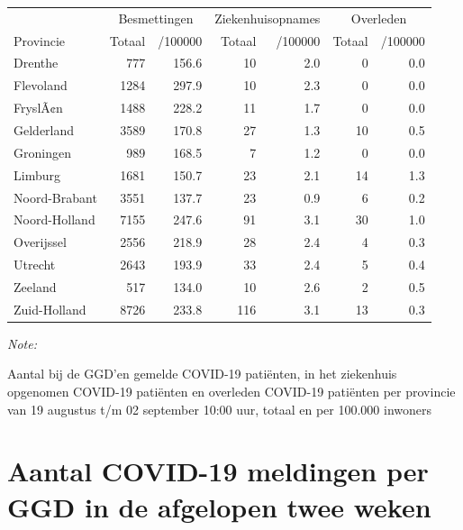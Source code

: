 \documentclass[
  english,
  man,floatsintext]{apa6}
\begin{document}
\begin{table}
\centering
\begin{threeparttable}
\begin{tabular}{lrrrrrr}
\toprule
\multicolumn{1}{c}{ } & \multicolumn{2}{c}{Besmettingen} & \multicolumn{2}{c}{Ziekenhuisopnames} & \multicolumn{2}{c}{Overleden} \\
\cmidrule(l{3pt}r{3pt}){2-3} \cmidrule(l{3pt}r{3pt}){4-5} \cmidrule(l{3pt}r{3pt}){6-7}
Provincie & Totaal & /100000 & Totaal & /100000 & Totaal & /100000\\
\midrule
Drenthe & 777 & 156.6 & 10 & 2.0 & 0 & 0.0\\
Flevoland & 1284 & 297.9 & 10 & 2.3 & 0 & 0.0\\
FryslÃ¢n & 1488 & 228.2 & 11 & 1.7 & 0 & 0.0\\
Gelderland & 3589 & 170.8 & 27 & 1.3 & 10 & 0.5\\
Groningen & 989 & 168.5 & 7 & 1.2 & 0 & 0.0\\
Limburg & 1681 & 150.7 & 23 & 2.1 & 14 & 1.3\\
Noord-Brabant & 3551 & 137.7 & 23 & 0.9 & 6 & 0.2\\
Noord-Holland & 7155 & 247.6 & 91 & 3.1 & 30 & 1.0\\
Overijssel & 2556 & 218.9 & 28 & 2.4 & 4 & 0.3\\
Utrecht & 2643 & 193.9 & 33 & 2.4 & 5 & 0.4\\
Zeeland & 517 & 134.0 & 10 & 2.6 & 2 & 0.5\\
Zuid-Holland & 8726 & 233.8 & 116 & 3.1 & 13 & 0.3\\
\bottomrule
\end{tabular}
\begin{tablenotes}
\item \textit{Note: } 
\item Aantal bij de GGD’en gemelde COVID-19 patiënten, in het ziekenhuis opgenomen COVID-19 patiënten en overleden COVID-19 patiënten per provincie van 19 augustus t/m 02 september 10:00 uur, totaal en per 100.000 inwoners
\end{tablenotes}
\end{threeparttable}
\end{table}

\newpage

\hypertarget{aantal-covid-19-meldingen-per-ggd-in-de-afgelopen-twee-weken}{%
\section{Aantal COVID-19 meldingen per GGD in de afgelopen twee weken}\label{aantal-covid-19-meldingen-per-ggd-in-de-afgelopen-twee-weken}}
\end{document}
